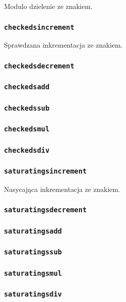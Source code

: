 Modulo dzielenie ze znakiem.

\subsubsection{\texttt{checkedsincrement}}

Sprawdzana inkrementacja ze znakiem.

\subsubsection{\texttt{checkedsdecrement}}
\subsubsection{\texttt{checkedsadd}}
\subsubsection{\texttt{checkedssub}}
\subsubsection{\texttt{checkedsmul}}
\subsubsection{\texttt{checkedsdiv}}

\subsubsection{\texttt{saturatingsincrement}}

Nasycająca inkrementacja ze znakiem.

\subsubsection{\texttt{saturatingsdecrement}}
\subsubsection{\texttt{saturatingsadd}}
\subsubsection{\texttt{saturatingssub}}
\subsubsection{\texttt{saturatingsmul}}
\subsubsection{\texttt{saturatingsdiv}}
